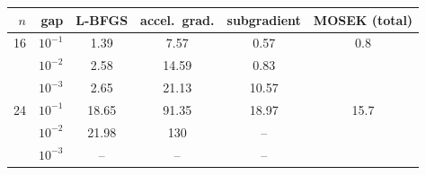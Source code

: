 \begin{tabular}{r r c c c c}\toprule
$n$ & gap & L-BFGS & accel.\ grad. & subgradient & MOSEK (total) \\\midrule
16 & $10^{-1}$ & 1.39 & 7.57 & 0.57 & 0.8 \\
 & $10^{-2}$ & 2.58 & 14.59 & 0.83 &  \\
 & $10^{-3}$ & 2.65 & 21.13 & 10.57 &  \\
24 & $10^{-1}$ & 18.65 & 91.35 & 18.97 & 15.7 \\
 & $10^{-2}$ & 21.98 & 130 & -- &  \\
 & $10^{-3}$ & -- & -- & -- &  \\
\bottomrule\end{tabular}
